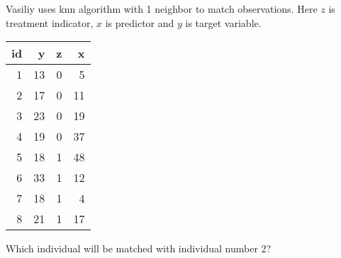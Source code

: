 
\begin{question}
Vasiliy uses knn algorithm with 1 neighbor to match observations.
Here \(z\) is treatment indicator, \(x\) is predictor and \(y\) is target variable.

\begin{longtable}[]{@{}rrrr@{}}
\toprule()
id & y & z & x \\
\midrule()
\endhead
1 & 13 & 0 & 5 \\
2 & 17 & 0 & 11 \\
3 & 23 & 0 & 19 \\
4 & 19 & 0 & 37 \\
5 & 18 & 1 & 48 \\
6 & 33 & 1 & 12 \\
7 & 18 & 1 & 4 \\
8 & 21 & 1 & 17 \\
\bottomrule()
\end{longtable}

Which individual will be matched with individual number 2?
\end{question}


